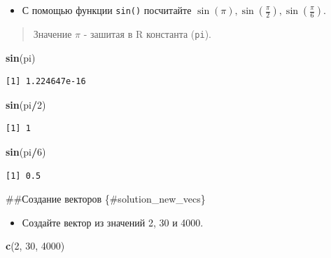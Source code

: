 \documentclass[
]{book}
\newenvironment{Shaded}{\begin{snugshade}}{\end{snugshade}}
\newcommand{\DecValTok}[1]{\textcolor[rgb]{0.00,0.00,0.81}{#1}}
\newcommand{\KeywordTok}[1]{\textcolor[rgb]{0.13,0.29,0.53}{\textbf{#1}}}
\newcommand{\NormalTok}[1]{#1}
\newcommand{\OperatorTok}[1]{\textcolor[rgb]{0.81,0.36,0.00}{\textbf{#1}}}
\providecommand{\tightlist}{%
  \setlength{\itemsep}{0pt}\setlength{\parskip}{0pt}}
\begin{document}
\begin{itemize}
\tightlist
\item
  С помощью функции \texttt{sin()} посчитайте \(\sin (\pi), \sin \left(\frac{\pi}{2}\right), \sin \left(\frac{\pi}{6}\right)\).
\end{itemize}

\begin{quote}
Значение \(\pi\) - зашитая в R константа (\texttt{pi}).
\end{quote}

\begin{Shaded}
\begin{Highlighting}[]
\KeywordTok{sin}\NormalTok{(pi)}
\end{Highlighting}
\end{Shaded}

\begin{verbatim}
[1] 1.224647e-16
\end{verbatim}

\begin{Shaded}
\begin{Highlighting}[]
\KeywordTok{sin}\NormalTok{(pi}\OperatorTok{/}\DecValTok{2}\NormalTok{)}
\end{Highlighting}
\end{Shaded}

\begin{verbatim}
[1] 1
\end{verbatim}

\begin{Shaded}
\begin{Highlighting}[]
\KeywordTok{sin}\NormalTok{(pi}\OperatorTok{/}\DecValTok{6}\NormalTok{)}
\end{Highlighting}
\end{Shaded}

\begin{verbatim}
[1] 0.5
\end{verbatim}

\#\#Создание векторов \{\#solution\_new\_vecs\}

\begin{itemize}
\tightlist
\item
  Создайте вектор из значений 2, 30 и 4000.
\end{itemize}

\begin{Shaded}
\begin{Highlighting}[]
\KeywordTok{c}\NormalTok{(}\DecValTok{2}\NormalTok{, }\DecValTok{30}\NormalTok{, }\DecValTok{4000}\NormalTok{)}
\end{Highlighting}
\end{Shaded}
\end{document}
